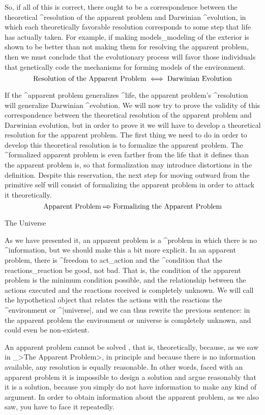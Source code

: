 So, if all of this is correct, there ought to be a correspondence
between the theoretical ^{resolution} of the apparent problem and
Darwinian ^{evolution}, in which each theoretically favorable resolution
corresponds to some step that life has actually taken. For example, if
making models_{modeling} of the exterior is shown to be better than not
making them for resolving the apparent problem, then we must conclude
that the evolutionary process will favor those individuals that
genetically code the mechanisms for forming models of the environment.
$$\hbox{Resolution of the Apparent Problem} \iff
  \hbox{Darwinian Evolution}$$

If the ^{apparent problem} generalizes ^{life}, the apparent problem's
^{resolution} will generalize Darwinian ^{evolution}. We will now try to
prove the validity of this correspondence between the theoretical
resolution of the apparent problem and Darwinian evolution, but in order
to prove it we will have to develop a theoretical resolution for the
apparent problem. The first thing we need to do in order to develop this
theoretical resolution is to formalize the apparent problem. The
^{formalized apparent problem} is even farther from the life that it
defines than the apparent problem is, so that formalization may
introduce distortions in the definition. Despite this reservation, the
next step for moving outward from the primitive self will consist of
formalizing the apparent problem in order to attack it theoretically.
$$\hbox{Apparent Problem} \etapa
 \hbox{Formalizing the Apparent Problem}$$


\Section The Universe

As we have presented it, an apparent problem is a ^{problem} in which
there is no ^{information}, but we should make this a bit more explicit.
In an apparent problem, there is ^{freedom} to act_{action} and the
^{condition} that the reactions_{reaction} be good, not bad. That is,
the condition of the apparent problem is the minimum condition possible,
and the relationship between the actions executed and the reactions
received is completely unknown. We will call the hypothetical object
that relates the actions with the reactions the ^{environment} or
^|universe|, and we can thus rewrite the previous sentence: in the
apparent problem the environment or universe is completely unknown, and
could even be non-existent.

An apparent problem cannot be solved , that is,
theoretically, because, as we saw in _>The Apparent Problem>, in
principle and because there is no information available, any resolution
is equally reasonable. In other words, faced with an apparent problem it
is impossible to design a solution and argue reasonably that it is a
solution, because you simply do not have information to make any kind of
argument. In order to obtain information about the apparent problem, as
we also saw, you have to face it repeatedly.

